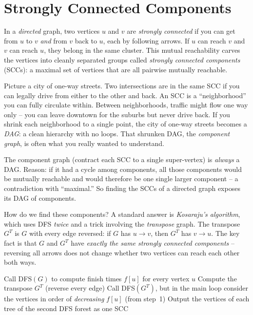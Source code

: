 \section{Strongly Connected Components}
\label{ch22:scc}

In a \emph{directed} graph, two vertices $u$
and $v$ are \emph{strongly connected} if you can get from $u$ to $v$ \emph{and}
from $v$ back to $u$, each by following arrows. If $u$ can reach $v$ and $v$ can reach $u$, they belong in the same cluster. This mutual reachability carves the vertices into cleanly separated groups called \emph{strongly connected components} (SCCs): a maximal set of vertices that are all pairwise mutually reachable.

\begin{intuitionbox}
Picture a city of one-way streets. Two intersections are in the same SCC if you
can legally drive from either to the other and back. An SCC is a
``neighborhood'' you can fully circulate within. Between neighborhoods, traffic
might flow one way only -- you can leave downtown for the suburbs but never drive
back. If you shrink each neighborhood to a single point, the city of one-way
streets becomes a \emph{DAG}: a clean hierarchy with no loops. That shrunken
DAG, the \emph{component graph}, is often what you really wanted to understand.
\end{intuitionbox}

\begin{focusbox}
The component graph (contract each SCC to a single super-vertex) is \emph{always}
a DAG. Reason: if it had a cycle among components, all those components would be
mutually reachable and would therefore be one single larger component -- a
contradiction with ``maximal.'' So finding the SCCs of a directed graph exposes
its DAG of components.
\end{focusbox}

How do we find these components? A standard answer is \emph{Kosaraju's
algorithm}, which uses DFS \emph{twice} and a trick involving the
\emph{transpose} graph. The transpose $G^{T}$ is $G$ with every edge reversed:
if $G$ has $u \to v$, then $G^{T}$ has $v \to u$. The key fact is that $G$ and $G^{T}$ have
\emph{exactly the same strongly connected components} -- reversing all arrows
does not change whether two vertices can reach each other both ways.

\begin{algorithm}[H]
\caption{Strongly-Connected-Components$(G)$}
Call DFS$(G)$ to compute finish times $f[u]$ for every vertex $u$\;
Compute the transpose $G^{T}$ (reverse every edge)\;
Call DFS$(G^{T})$, but in the main loop consider the vertices in order of
\emph{decreasing} $f[u]$ (from step~1)\;
Output the vertices of each tree of the second DFS forest as one SCC\;
\end{algorithm}

